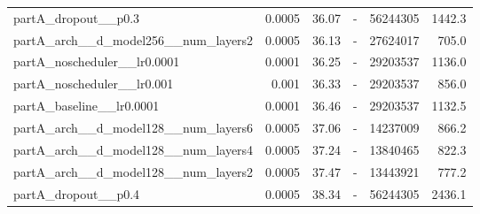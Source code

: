 \begin{tabular}{lrrrrr}
partA\_dropout\_\_p0.3 & 0.0005 & 36.07 & - & 56244305 & 1442.3 \\
partA\_arch\_\_d\_model256\_\_num\_layers2 & 0.0005 & 36.13 & - & 27624017 & 705.0 \\
partA\_noscheduler\_\_lr0.0001 & 0.0001 & 36.25 & - & 29203537 & 1136.0 \\
partA\_noscheduler\_\_lr0.001 & 0.001 & 36.33 & - & 29203537 & 856.0 \\
partA\_baseline\_\_lr0.0001 & 0.0001 & 36.46 & - & 29203537 & 1132.5 \\
partA\_arch\_\_d\_model128\_\_num\_layers6 & 0.0005 & 37.06 & - & 14237009 & 866.2 \\
partA\_arch\_\_d\_model128\_\_num\_layers4 & 0.0005 & 37.24 & - & 13840465 & 822.3 \\
partA\_arch\_\_d\_model128\_\_num\_layers2 & 0.0005 & 37.47 & - & 13443921 & 777.2 \\
partA\_dropout\_\_p0.4 & 0.0005 & 38.34 & - & 56244305 & 2436.1 \\
\bottomrule
\end{tabular}